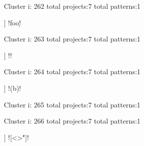 Cluster i: 262
total projects:7
total patterns:1
\begin{multicols}{1}
\begin{description}[noitemsep,topsep=0pt]
\item [[7] ] \cverb!foo\d!
\end{description}
\end{multicols}







Cluster i: 263
total projects:7
total patterns:1
\begin{multicols}{1}
\begin{description}[noitemsep,topsep=0pt]
\item [[7] ] \cverb!\(\)!
\end{description}
\end{multicols}







Cluster i: 264
total projects:7
total patterns:1
\begin{multicols}{1}
\begin{description}[noitemsep,topsep=0pt]
\item [[7] ] \cverb!\s(b)!
\end{description}
\end{multicols}







Cluster i: 265
total projects:7
total patterns:1
\begin{multicols}{1}
\begin{description}[noitemsep,topsep=0pt]
\item [[7] ] \cverb!=[ =]*$!
\end{description}
\end{multicols}







Cluster i: 266
total projects:7
total patterns:1
\begin{multicols}{1}
\begin{description}[noitemsep,topsep=0pt]
\item [[7] ] \cverb![<>\'"]!
\end{description}
\end{multicols}







